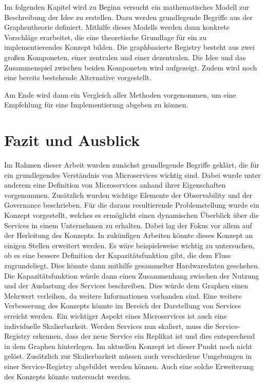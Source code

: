 \documentclass[
	12pt,
	BCOR=5mm,
	DIV=12,
	headinclude=on,
	footinclude=off,
	parskip=half,
	bibliography=totoc,
	listof=entryprefix,
	toc=listof,
	numbers=noenddot,
	plainfootsepline
]{scrreprt}
\begin{document}
Im folgenden Kapitel wird zu Beginn versucht ein mathematisches Modell zur Beschreibung der Idee zu erstellen. Dazu werden grundlegende Begriffe aus der Graphentheorie definiert. Mithilfe dieses Modells werden dann konkrete Vorschläge erarbeitet, die eine theoretische Grundlage für ein zu implementierendes Konzept bilden. Die graphbasierte Registry besteht aus zwei großen Komponeten, einer zentralen und einer dezentralen. Die Idee und das Zusammenspiel zwischen beiden Komponeten wird aufgezeigt. Zudem wird noch eine bereits bestehende Alternative vorgestellt.

Am Ende wird dann ein Vergleich aller Methoden vorgenommen, um eine Empfehlung für eine Implementierung abgeben zu können.





\chapter{Fazit und Ausblick}

Im Rahmen dieser Arbeit wurden zunächst grundlegende Begriffe geklärt, die für ein grundlegendes Verständnis von Microservices wichtig sind. Dabei wurde unter anderem eine Definition von Microservices anhand ihrer Eigenschaften vorgenommen. Zusätzlich wurden wichtige Elemente der Observability und der Governance beschrieben. Für die daraus resultierende Problemstellung wurde ein Konzept vorgestellt, welches es ermöglicht einen dynamischen Überblick über die Services in einem Unternehmen zu erhalten. Dabei lag der Fokus vor allem auf der Herleitung des Konzepts. In zukünfigen Arbeiten könnte dieses Konzept an einigen Stellen erweitert werden. Es wäre beispielsweise wichtig zu untersuchen, ob es eine bessere Definition der Kapazitätsfunktion gibt, die dem Fluss zugrundeliegt. Dies könnte dann mithilfe gesammelter Hardwaredaten geschehen. Die Kapazitätsfunktion würde dann einen Zusammenhang zwischen der Nutzung und der Auslastung des Services beschreiben. Dies würde dem Graphen einen Mehrwert verleihen, da weitere Informationen vorhanden sind. Eine weitere Verbesserung des Konzepts könnte im Bereich der Darstellung von Services erreicht werden. Ein wichtiger Aspekt eines Microservices ist auch eine individuelle Skalierbarkeit. Werden Services nun skaliert, muss die Service-Registry erkennen, dass der neue Service ein Replikat ist und dies entsprechend in dem Graphen hinterlegen. Im aktuellen Konzept ist dieser Punkt noch nicht gelöst. Zusätzlich zur Skalierbarkeit müssen auch verschiedene Umgebungen in einer Service-Registry abgebildet werden können. Auch eine solche Erweiterung des Konzepts könnte untersucht werden.
\end{document}
